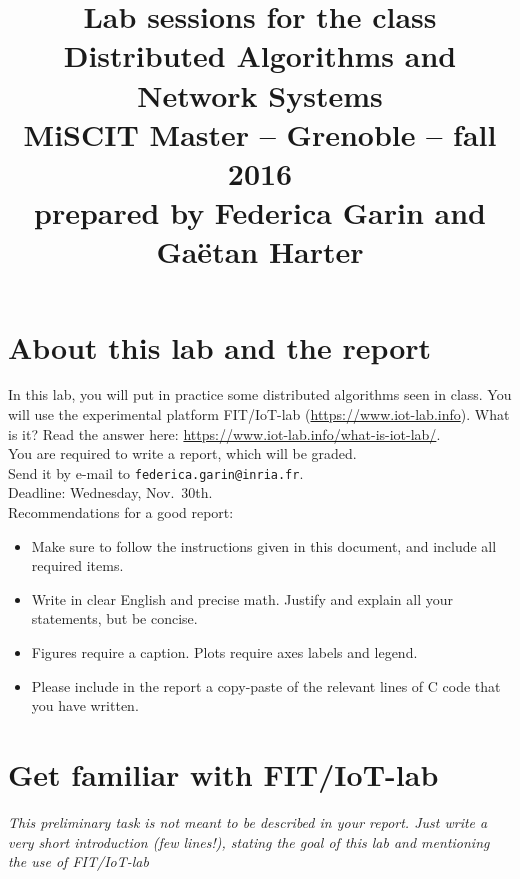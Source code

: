 \documentclass{article}
\begin{document}
\title{
{\normalsize Lab sessions for the class}\\[-1mm]
Distributed Algorithms and Network Systems\\[-2mm]
{\normalsize MiSCIT Master -- Grenoble -- fall 2016}\\[-1mm]
{\normalsize prepared by Federica Garin and Ga\"{e}tan Harter}}
\date{}
\maketitle



\section{About this lab and the report}
In this lab, you will put in practice some distributed algorithms seen in class.
You will use the experimental platform FIT/IoT-lab (\url{https://www.iot-lab.info}).
What is it? Read the answer here: \url{https://www.iot-lab.info/what-is-iot-lab/}.\\

You are required to write a report, which will be graded.\\ Send it by e-mail to \texttt{federica.garin@inria.fr}.\\
Deadline: Wednesday, Nov.~30th.\\

Recommendations for a good report:
\begin{itemize}
\item Make sure to follow the instructions given in this document, and include all required items.
\item Write in clear English and precise math. Justify and explain all your statements, but be concise.
\item Figures require a caption. Plots require axes labels and legend.
\item Please include in the report a copy-paste of the relevant lines of C code that you have written.
\end{itemize}

\newpage

\section{Get familiar with FIT/IoT-lab}


\textit{\color{blue} This preliminary task is not meant to be described in your report. Just write a very short introduction (few lines!), stating the goal of this lab and mentioning the use of FIT/IoT-lab}\\
\end{document}
